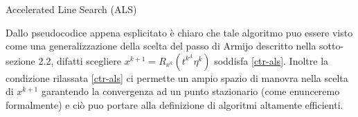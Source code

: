 \documentclass[a4paper, 12pt]{article}
\begin{document}
\begin{center}
\begin{algorithm}[H]
\SetAlgoLined
{}
\caption{Accelerated Line Search (ALS)}
\end{algorithm}
\end{center}
Dallo pseudocodice appena esplicitato è chiaro che tale algoritmo puo essere visto come una generalizzazione della scelta del passo di Armijo descritto nella sotto-sezione 2.2, difatti scegliere $x^{k+1} = R_{x^k}(t^{k^A}\eta^k)$ soddisfa \eqref{ctr-als}. Inoltre la condizione rilassata \eqref{ctr-als} ci permette un ampio spazio di manovra nella scelta di $x^{k+1}$ garantendo la convergenza ad un punto stazionario (come enunceremo formalmente) e ciò puo portare alla definizione di algoritmi altamente efficienti.
\end{document}

